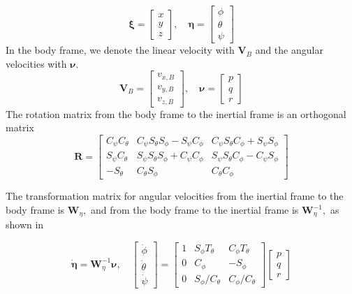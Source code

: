 $$
\boldsymbol{\xi}=\left[\begin{array}{l}
x \\
y \\
z
\end{array}\right], \quad \boldsymbol{\eta}=\left[\begin{array}{l}
\phi \\
\theta \\
\psi
\end{array}\right]
$$
In the body frame, we denote the linear velocity with $\boldsymbol{V}_{B}$ and the angular velocities with $\boldsymbol{\nu}$.
$$
\boldsymbol{V}_{B}=\left[\begin{array}{l}
v_{x, B} \\
v_{y, B} \\
v_{z, B}
\end{array}\right], \quad \boldsymbol{\nu}=\left[\begin{array}{l}
p \\
q \\
r
\end{array}\right]
$$
The rotation matrix from the body frame to the inertial frame is an orthogonal matrix
$$
\boldsymbol{R}=\left[\begin{array}{ccc}
C_{\psi} C_{\theta} & C_{\psi} S_{\theta} S_{\phi}-S_{\psi} C_{\phi} & C_{\psi} S_{\theta} C_{\phi}+S_{\psi} S_{\phi} \\
S_{\psi} C_{\theta} & S_{\psi} S_{\theta} S_{\phi}+C_{\psi} C_{\phi} & S_{\psi} S_{\theta} C_{\phi}-C_{\psi} S_{\phi} \\
-S_{\theta} & C_{\theta} S_{\phi} & C_{\theta} C_{\phi}
\end{array}\right]
$$

The transformation matrix for angular velocities from the inertial frame to the body frame is $\boldsymbol{W}_{\eta},$ and from the body frame to the inertial frame is $\boldsymbol{W}_{\eta}^{-1},$ as shown in

\begin{equation}
\dot{\boldsymbol{\eta}}=\boldsymbol{W}_{\eta}^{-1} \boldsymbol{\nu}, \quad\left[\begin{array}{c}
\dot{\phi} \\
\dot{\theta} \\
\dot{\psi}
\end{array}\right]=\left[\begin{array}{ccc}
1 & S_{\phi} T_{\theta} & C_{\phi} T_{\theta} \\
0 & C_{\phi} & -S_{\phi} \\
0 & S_{\phi} / C_{\theta} & C_{\phi} / C_{\theta}
\end{array}\right]\left[\begin{array}{l}
p \\
q \\
r
\end{array}\right]
\end{equation}



